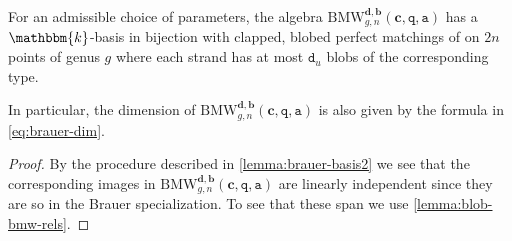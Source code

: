 \documentclass[a4paper,11pt]{amsart}
\newcommand{\setstuff}[1]{\mathrm{#1}}
\newcommand{\KK}{\mathbbm{k}}
\newcommand{\bsym}[1]{\boldsymbol{#1}}
\newcommand{\varsym}[1]{\mathtt{#1}}
\newcommand{\qvar}{\varsym{q}}
\newcommand{\cpar}{\bsym{c}}
\newcommand{\bpar}{\bsym{b}}
\newcommand{\dpar}{\bsym{d}}
\newcommand{\dvar}{\varsym{d}}
\newcommand{\avar}{\varsym{a}}
\numberwithin{equation}{section}
\let\fullref\autoref
\begin{document}
\begin{lemma}\label{lemma:bmw-basis-2}
For an admissible choice of parameters, the algebra 
$\setstuff{BMW}_{g,n}^{\dpar,\bpar}(\cpar,\qvar,\avar)$ 
has a $\KK$-basis in bijection with clapped, blobed 
perfect matchings of 
on $2n$ points of genus  
$g$ where each strand has at 
most $\dvar_{u}$ blobs of the corresponding type.
\end{lemma}

In particular, the dimension of  $\setstuff{BMW}_{g,n}^{\dpar,\bpar}(\cpar,\qvar,\avar)$
is also given by the formula in \eqref{eq:brauer-dim}.

\begin{proof}
By the procedure described in 
\fullref{lemma:brauer-basis2} we see that the 
corresponding images in 
$\setstuff{BMW}_{g,n}^{\dpar,\bpar}(\cpar,\qvar,\avar)$ are
linearly independent since they are so in the Brauer 
specialization. To see that these span we use 
\fullref{lemma:blob-bmw-rels}.
\end{proof}
\end{document}
